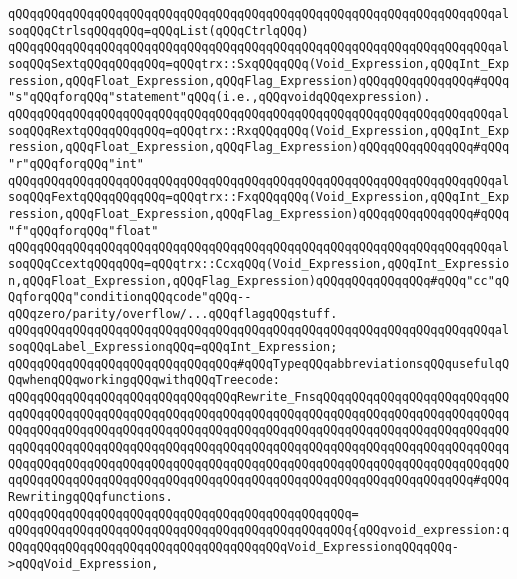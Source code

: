 \verb|qQQqqQQqqQQqqQQqqQQqqQQqqQQqqQQqqQQqqQQqqQQqqQQqqQQqqQQqqQQqqQQqqQQqalsoqQQqCtrlsqQQqqQQq=qQQqList(qQQqCtrlqQQq)|\newline
\verb|qQQqqQQqqQQqqQQqqQQqqQQqqQQqqQQqqQQqqQQqqQQqqQQqqQQqqQQqqQQqqQQqqQQqalsoqQQqSextqQQqqQQqqQQq=qQQqtrx::SxqQQqqQQq(Void_Expression,qQQqInt_Expression,qQQqFloat_Expression,qQQqFlag_Expression)qQQqqQQqqQQqqQQq#qQQq"s"qQQqforqQQq"statement"qQQq(i.e.,qQQqvoidqQQqexpression).|\newline
\verb|qQQqqQQqqQQqqQQqqQQqqQQqqQQqqQQqqQQqqQQqqQQqqQQqqQQqqQQqqQQqqQQqqQQqalsoqQQqRextqQQqqQQqqQQq=qQQqtrx::RxqQQqqQQq(Void_Expression,qQQqInt_Expression,qQQqFloat_Expression,qQQqFlag_Expression)qQQqqQQqqQQqqQQq#qQQq"r"qQQqforqQQq"int"|\newline
\verb|qQQqqQQqqQQqqQQqqQQqqQQqqQQqqQQqqQQqqQQqqQQqqQQqqQQqqQQqqQQqqQQqqQQqalsoqQQqFextqQQqqQQqqQQq=qQQqtrx::FxqQQqqQQq(Void_Expression,qQQqInt_Expression,qQQqFloat_Expression,qQQqFlag_Expression)qQQqqQQqqQQqqQQq#qQQq"f"qQQqforqQQq"float"|\newline
\verb|qQQqqQQqqQQqqQQqqQQqqQQqqQQqqQQqqQQqqQQqqQQqqQQqqQQqqQQqqQQqqQQqqQQqalsoqQQqCcextqQQqqQQq=qQQqtrx::CcxqQQq(Void_Expression,qQQqInt_Expression,qQQqFloat_Expression,qQQqFlag_Expression)qQQqqQQqqQQqqQQq#qQQq"cc"qQQqforqQQq"conditionqQQqcode"qQQq--qQQqzero/parity/overflow/...qQQqflagqQQqstuff.|\newline
\verb|qQQqqQQqqQQqqQQqqQQqqQQqqQQqqQQqqQQqqQQqqQQqqQQqqQQqqQQqqQQqqQQqqQQqalsoqQQqLabel_ExpressionqQQq=qQQqInt_Expression;|\newline
\newline
\newline
\newline
\verb|qQQqqQQqqQQqqQQqqQQqqQQqqQQqqQQq#qQQqTypeqQQqabbreviationsqQQqusefulqQQqwhenqQQqworkingqQQqwithqQQqTreecode:|\newline
\newline
\verb|qQQqqQQqqQQqqQQqqQQqqQQqqQQqqQQqRewrite_FnsqQQqqQQqqQQqqQQqqQQqqQQqqQQqqQQqqQQqqQQqqQQqqQQqqQQqqQQqqQQqqQQqqQQqqQQqqQQqqQQqqQQqqQQqqQQqqQQqqQQqqQQqqQQqqQQqqQQqqQQqqQQqqQQqqQQqqQQqqQQqqQQqqQQqqQQqqQQqqQQqqQQqqQQqqQQqqQQqqQQqqQQqqQQqqQQqqQQqqQQqqQQqqQQqqQQqqQQqqQQqqQQqqQQqqQQqqQQqqQQqqQQqqQQqqQQqqQQqqQQqqQQqqQQqqQQqqQQqqQQqqQQqqQQqqQQqqQQqqQQqqQQqqQQqqQQqqQQqqQQqqQQqqQQqqQQqqQQqqQQqqQQqqQQqqQQqqQQqqQQqqQQqqQQqqQQq#qQQqRewritingqQQqfunctions.|\newline
\verb|qQQqqQQqqQQqqQQqqQQqqQQqqQQqqQQqqQQqqQQqqQQqqQQq=|\newline
\verb|qQQqqQQqqQQqqQQqqQQqqQQqqQQqqQQqqQQqqQQqqQQqqQQq{qQQqvoid_expression:qQQqqQQqqQQqqQQqqQQqqQQqqQQqqQQqqQQqqQQqVoid_ExpressionqQQqqQQq->qQQqVoid_Expression,|\newline
